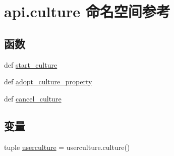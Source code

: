 \hypertarget{namespaceapi_1_1culture}{\section{api.\-culture 命名空间参考}
\label{namespaceapi_1_1culture}
}
\subsection*{函数}
\begin{DoxyCompactItemize}
\item 
def \hyperlink{namespaceapi_1_1culture_a06ec35fa3e8582635eb5ab0c8183aa2e}{start\-\_\-culture}
\item 
def \hyperlink{namespaceapi_1_1culture_a77a1ca1beaca1562bb9992186f69f1f9}{adopt\-\_\-culture\-\_\-property}
\item 
def \hyperlink{namespaceapi_1_1culture_a22b318b71c1b32a8b62e0cd148988368}{cancel\-\_\-culture}
\end{DoxyCompactItemize}
\subsection*{变量}
\begin{DoxyCompactItemize}
\item 
tuple \hyperlink{namespaceapi_1_1culture_a1a84cfd49a176913558950d24000254a}{userculture} = userculture.\-culture()
\end{DoxyCompactItemize}


